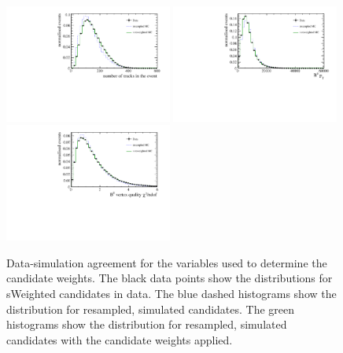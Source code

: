 \begin{figure}[!htb]
 \centering
 \includegraphics[width=0.49\textwidth]{figs/kpimm/data-mc/reweighting/nTracks.pdf}
 \includegraphics[width=0.49\textwidth]{figs/kpimm/data-mc/reweighting/B0_PT.pdf}
 \includegraphics[width=0.49\textwidth]{figs/kpimm/data-mc/reweighting/B0_VertexChi2.pdf}
 
 \caption{Data-simulation agreement for the variables used to determine the candidate weights. The black data points show the distributions for sWeighted \BdToJPsiKst candidates in data. The blue dashed histograms show the distribution for resampled, simulated \BdToJPsiKst candidates. The green histograms show the distribution for resampled, simulated \BdToJPsiKst candidates with the candidate weights applied.}
 \label{fig:data-mc:reweight}
\end{figure}
 
